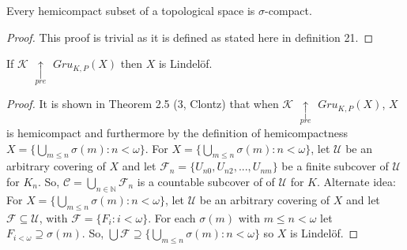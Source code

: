 \documentclass{article}
\begin{document}
	\begin{theorem}
		Every hemicompact subset of a topological space is \(\sigma\)-compact.
	\end{theorem}
	\begin{proof}
		This proof is trivial as it is defined as stated here in definition 21.
	\end{proof}

	\begin{theorem}
		If $\mathcal{K}$ $\underset{pre}{\uparrow}$ $Gru_{K, P} (X)$ then $X$ is Lindel\"of.
	\end{theorem}
	\begin{proof}
	 It is shown in Theorem 2.5 (3, Clontz) that when $\mathcal{K}$ $\underset{pre}{\uparrow}$ $Gru_{K, P} (X)$, $X$ is hemicompact and furthermore by the definition of hemicompactness  $X = \lbrace \bigcup_{m \leq n} \sigma (m) : n < \omega \rbrace$.
	 \newline\newline
	 For $X = \lbrace \bigcup_{m \leq n} \sigma (m) : n < \omega \rbrace$, let $\mathcal{U}$ be an arbitrary covering of $X$ and let $\mathcal{F}_n = \lbrace U_{n0}, U_{n2}, ... , U_{nm}\rbrace$ be a finite subcover of $\mathcal{U}$ for $K_n$. So, $\mathcal{C} = \bigcup_{n \in \mathbb{N}} \mathcal{F}_n$ is a countable subcover of of $\mathcal{U}$ for $K$.\newline \newline
	 Alternate idea:
	 \newline
	 For $X = \lbrace \bigcup_{m \leq n} \sigma (m) : n < \omega \rbrace$, let $\mathcal{U}$ be an arbitrary covering of $X$ and let $\mathcal{F} \subseteq \mathcal{U}$, with $\mathcal{F} = \lbrace F_i : i < \omega \rbrace$. For each $\sigma(m)$ with $m \leq n < \omega$ let $F_{i < \omega} \supseteq \sigma(m)$. So, $\bigcup \mathcal{F} \supseteq \lbrace \bigcup_{m \leq n} \sigma(m) : n < \omega \rbrace$ so $X$ is Lindel\"of.
	\end{proof}
\end{document}
